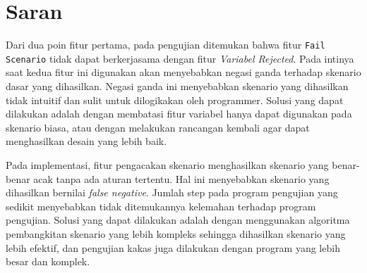 \section{Saran}

Dari dua poin fitur pertama, pada pengujian ditemukan bahwa fitur \texttt{Fail Scenario} tidak dapat berkerjasama dengan fitur
\textit{Variabel Rejected}. Pada intinya saat kedua fitur ini digunakan akan menyebabkan negasi ganda terhadap skenario
dasar yang dihasilkan. Negasi ganda ini menyebabkan skenario yang dihasilkan tidak intuitif dan sulit untuk dilogikakan
oleh programmer. Solusi yang dapat dilakukan adalah dengan membatasi fitur variabel hanya dapat digunakan pada skenario
biasa, atau dengan melakukan rancangan kembali agar dapat menghasilkan desain yang lebih baik.

Pada implementasi, fitur pengacakan skenario menghasilkan skenario yang benar-benar acak tanpa ada aturan tertentu.
Hal ini menyebabkan skenario yang dihasilkan bernilai \textit{false negative}. Jumlah step pada program pengujian
yang sedikit menyebabkan tidak ditemukannya kelemahan terhadap program pengujian. Solusi yang dapat dilakukan
adalah dengan menggunakan algoritma pembangkitan skenario yang lebih kompleks sehingga dihasilkan skenario yang lebih efektif,
dan pengujian kakas juga dilakukan dengan program yang lebih besar dan komplek.